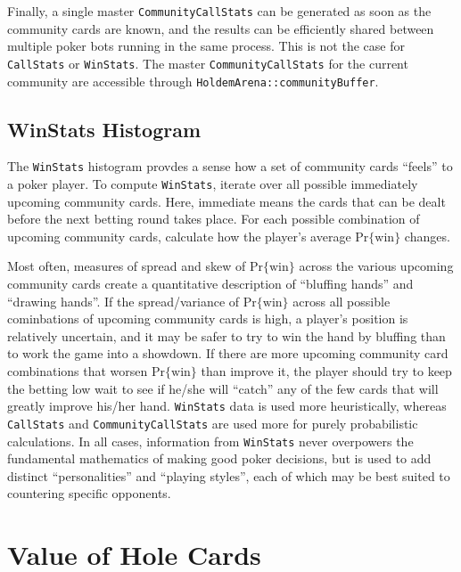 Finally, a single master \texttt{CommunityCallStats} can be generated as soon as the community cards are known, and the results can be efficiently shared between multiple poker bots running in the same process.
This is not the case for \texttt{CallStats} or \texttt{WinStats}.
The master \texttt{CommunityCallStats} for the current community are accessible through \texttt{HoldemArena::communityBuffer}.


\subsection{WinStats Histogram}
\label{sec:WinStats}

The \texttt{WinStats} histogram provdes a sense how a set of community cards ``feels'' to a poker player.
To compute \texttt{WinStats}, iterate over all possible immediately upcoming community cards.
Here, immediate means the cards that can be dealt before the next betting round takes place.
For each possible combination of upcoming community cards, calculate how the player's average $\mathrm{Pr\{win\}}$ changes.

Most often, measures of spread and skew of $\mathrm{Pr\{win\}}$ across the various upcoming community cards create a quantitative description of ``bluffing hands'' and ``drawing hands''.
If the spread/variance of $\mathrm{Pr\{win\}}$ across all possible cominbations of upcoming community cards is high, a player's position is relatively uncertain, and it may be safer to try to win the hand by bluffing than to work the game into a showdown.
If there are more upcoming community card combinations that worsen $\mathrm{Pr\{win\}}$ than improve it, the player should try to keep the betting low wait to see if he/she will ``catch'' any of the few cards that will greatly improve his/her hand.
\texttt{WinStats} data is used more heuristically, whereas \texttt{CallStats} and \texttt{CommunityCallStats} are used more for purely probabilistic calculations.
In all cases, information from \texttt{WinStats} never overpowers the fundamental mathematics of making good poker decisions, but is used to add distinct ``personalities'' and ``playing styles'', each of which may be best suited to countering specific opponents.


\section{Value of Hole Cards}

